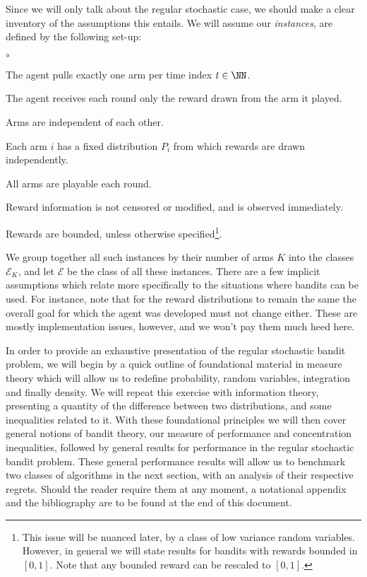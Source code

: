 \par Since we will only talk about the regular stochastic case, we should make a clear inventory of the assumptions this entails. We will assume our {\em instances}, are defined by the following set-up:
\begin{list}{$\circ$}{}
\item The agent pulls exactly one arm per time index $t\in\NN$.
\item The agent receives each round only the reward drawn from the arm it played.
\item Arms are independent of each other.
\item Each arm $i$ has a fixed distribution $P_i$ from which rewards are drawn independently. 
\item All arms are playable each round.
\item Reward information is not censored or modified, and is observed immediately.
\item Rewards are bounded, unless otherwise specified\footnote{This issue will be nuanced later, by a class of low variance random variables. However, in general we will state results for bandits with rewards bounded in $[0,1]$. Note that any bounded reward can be rescaled to $[0,1]$.}.
\end{list}
We group together all such instances by their number of arms $K$ into the classes $\mathcal{E}_K$, and let $\mathcal{E}$ be the class of all these instances. There are a few implicit assumptions which relate more specifically to the situations where bandits can be used. For instance, note that for the reward distributions to remain the same the overall goal for which the agent was developed must not change either. These are mostly implementation issues, however, and we won't pay them much heed here. 


	


\par In order to provide an exhaustive presentation of the regular stochastic bandit problem, we will begin by a quick outline of foundational material in measure theory which will allow us to redefine probability, random variables, integration and finally density. We will repeat this exercise with information theory, presenting a quantity of the difference between two distributions, and some inequalities related to it. With these foundational principles we will then cover general notions of bandit theory, our measure of performance and concentration inequalities, followed by general results for performance in the regular stochastic bandit problem. These general performance results will allow us to benchmark two classes of algorithms in the next section, with an analysis of their respective regrets.  Should the reader require them at any moment, a notational appendix and the bibliography are to be found at the end of this document. 


